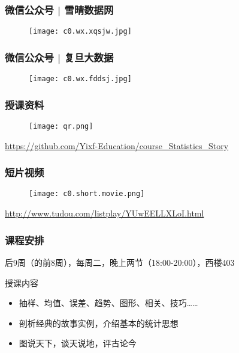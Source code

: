 \begin{frame}
  \frametitle{微信公众号 | 雪晴数据网}
  \begin{figure}
    \centering
    \texttt{[image: c0.wx.xqsjw.jpg]}
  \end{figure}
\end{frame}
\begin{frame}
  \frametitle{微信公众号 | 复旦大数据}
  \begin{figure}
    \centering
    \texttt{[image: c0.wx.fddsj.jpg]}
  \end{figure}
\end{frame}

\begin{frame}
  \frametitle{授课资料}
  \begin{figure}
    \centering
    \texttt{[image: qr.png]}
  \end{figure}
  \begin{center}
    \href{https://github.com/Yixf-Education/course_Statistics_Story}{https://github.com/Yixf-Education/course\_Statistics\_Story}
  \end{center}
\end{frame}

\begin{frame}
  \frametitle{短片视频}
  \begin{figure}
    \centering
    \texttt{[image: c0.short.movie.png]}
  \end{figure}
  \begin{center}
    \href{http://www.tudou.com/listplay/YUwEELLXLoI.html}{http://www.tudou.com/listplay/YUwEELLXLoI.html}
  \end{center}
\end{frame}

\begin{frame}
  \frametitle{课程安排}
  \begin{center}
  \alert{后9周（的前8周），每周二，晚上两节（18:00-20:00），西楼403}\\
  \vspace{0.2cm}
  \end{center}
  \begin{block}{授课内容}
    \begin{itemize}
      \item 抽样、均值、误差、趋势、图形、相关、技巧……
      \item 剖析经典的故事实例，介绍基本的统计思想
      \item 图说天下，谈天说地，评古论今
    \end{itemize}
  \end{block}
\end{frame}

